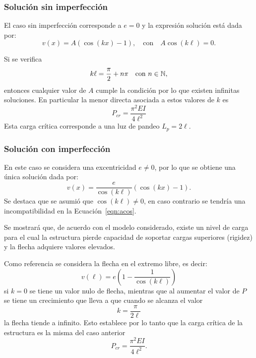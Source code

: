\subsubsection{Solución sin imperfección}

El caso sin imperfección corresponde a $e=0$ y la expresión solución está dada por:
%
\begin{equation}
v(x) = A (\cos(k x) -1), \quad \text{con} \quad A\cos(k\ell) = 0.
\end{equation}

Si se verifica
%
\begin{equation}
k \ell = \frac{\pi}{2} + n\pi  \quad \text{con} \,\, n\in {\mathbb N},
\end{equation}
%
entonces cualquier valor de $A$ cumple la condición por lo que existen infinitas soluciones. %
%
En particular la menor directa asociada a estos valores de $k$ es
\begin{equation}
\boxed{
P_{cr} = \frac{\pi^2 E I}{4 \ell^2}}
\end{equation}
%
Esta carga crítica corresponde a una luz de pandeo $L_p = 2\ell$.

\subsubsection{Solución con imperfección}

En este caso se considera una excentricidad $e \neq 0$, por lo que se obtiene una única solución dada por:
%
\begin{equation}
v(x) = \frac{e}{\cos(k\ell)} (\cos(k x) -1).
\end{equation}
%
Se destaca que se asumió que $\cos(k \ell) \neq 0$, en caso contrario se tendría una incompatibilidad en la Ecuación~\eqref{eqn:acos}. %

Se mostrará que, de acuerdo con el modelo considerado, existe un nivel de carga para el cual la estructura pierde capacidad de soportar cargas superiores (rigidez) y la flecha adquiere valores elevados. %
%

Como referencia se considera la flecha en el extremo libre, es decir:
%
\begin{equation}
v(\ell) = e \left( 1- \frac{1}{\cos(k\ell) }  \right)
\end{equation}
%
si $k=0$ se tiene un valor nulo de flecha, mientras que al aumentar el valor de $P$ se tiene un crecimiento que lleva a que cuando se alcanza el valor 
%
\begin{equation}
k = \frac{\pi}{2 \ell }
\end{equation}
%
la flecha tiende a infinito. %
%
Esto establece por lo tanto que la carga crítica de la estructura es la misma del caso anterior
%
\begin{equation}
\boxed{
	P_{cr} = \frac{\pi^2 E I}{4 \ell^2}.
}
\end{equation}



